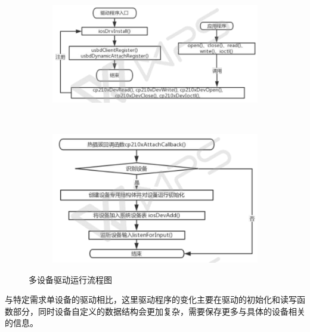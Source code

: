 \begin{figure}[p, !h]
\centering
  \begin{subfigure}[b]{1.0\textwidth}
  \includegraphics[width=\textwidth]{./graphics/MDev-Drv-Diagram-a.pdf}
  \caption{}\label{fig:MDevice-Driver-diagram-a}
  \end{subfigure}
  ~
  \begin{subfigure}[b]{1.0\textwidth}
  \includegraphics[width=\textwidth]{./graphics/MDev-Drv-Diagram-b.pdf}
  \caption{}\label{fig:MDevice-Driver-diagram-b}
  \end{subfigure}
\caption{多设备驱动运行流程图}\label{fig:MDev-Drv-diagram}
\end{figure}


与特定需求单设备的驱动相比，这里驱动程序的变化主要在驱动的初始化和读写函数部分，同时设备自定义的数据结构会更加复杂，需要保存更多与具体的设备相关的信息。

